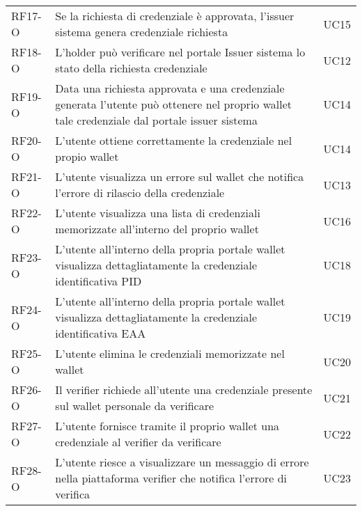 \begin{longtable}{|p{}|p{}|p{}|}
        RF17-O & Se la richiesta di credenziale  è approvata, l'issuer sistema genera credenziale richiesta & UC15\\
        RF18-O & L'holder può verificare nel portale Issuer sistema lo stato della richiesta credenziale & UC12\\ 
        RF19-O & Data una richiesta approvata e una credenziale generata l'utente può ottenere nel proprio wallet tale credenziale dal portale issuer sistema & UC14 \\
        RF20-O & L'utente ottiene correttamente la credenziale nel propio wallet & UC14\\
        RF21-O & L'utente visualizza un errore sul wallet che notifica l'errore di rilascio della credenziale & UC13\\
        RF22-O & L'utente visualizza una lista di credenziali memorizzate all'interno del proprio wallet& UC16\\
        RF23-O & L'utente all'interno della propria portale wallet visualizza dettagliatamente la credenziale identificativa PID & UC18\\
        RF24-O & L'utente all'interno della propria portale wallet visualizza dettagliatamente la credenziale identificativa EAA & UC19\\
        RF25-O & L'utente elimina le credenziali memorizzate nel wallet & UC20\\
        RF26-O & Il verifier richiede all'utente una credenziale presente sul wallet personale da verificare & UC21\\
        RF27-O & L'utente fornisce tramite il proprio wallet una credenziale al verifier da verificare & UC22\\
        RF28-O & L'utente riesce a visualizzare un messaggio di errore nella piattaforma verifier che notifica l'errore di verifica & UC23\\
        \hline
    \end{longtable}

